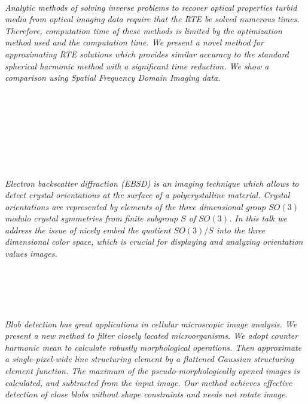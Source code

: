 \begin{multicols}{2}
\\
    \textit{Analytic methods of solving inverse problems to recover optical properties turbid media from optical imaging data require that the RTE be solved numerous times.  Therefore, computation time of these methods is limited by the optimization method used and the computation time.  We present a novel method for approximating RTE solutions which provides similar accuracy to the standard spherical harmonic method with a significant time reduction.  We show a comparison using Spatial Frequency Domain Imaging data.}\\
\\ 
      \\
      \\\\
      \\
      \\\\
\\
    \textit{Electron backscatter diffraction (EBSD) is an imaging technique which allows to detect crystal orientations at the surface of a polycrystalline material. Crystal orientations are represented by elements of the three dimensional group $SO(3)$ modulo crystal symmetries from finite subgroup $S$ of $SO(3)$. In this talk we address the issue of nicely embed the quotient $SO(3)/S$ into the three dimensional color space, which is crucial for displaying and analyzing orientation values images.}\\
\\ 
      \\
      \\\\
\\
    \textit{Blob detection has great applications in cellular microscopic image analysis. We present a new method to filter closely located microorganisms. We adopt counter harmonic mean to calculate robustly morphological operations. Then approximate a single-pixel-wide line structuring element by a flattened Gaussian structuring element function. The maximum of the pseudo-morphologically opened images is calculated, and subtracted from the input image. Our method achieves effective detection of close blobs without shape constraints and needs not rotate image.}\\
\\ 
      \\

\end{multicols}
